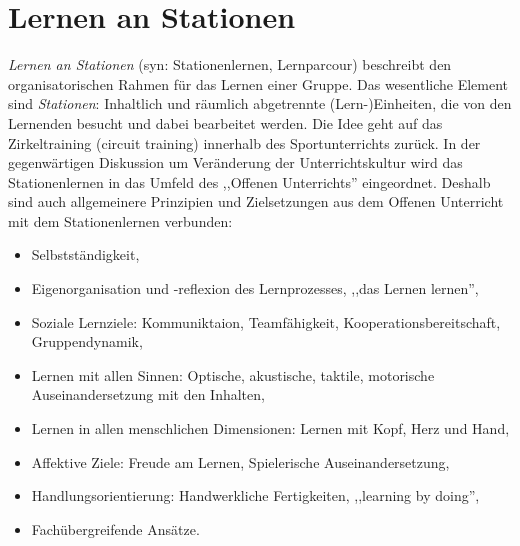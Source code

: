 \bip\bip
\section{Lernen an Stationen}

\emph{Lernen an Stationen} (syn: Stationenlernen, Lernparcour) beschreibt den organisatorischen Rahmen f\"{u}r
das Lernen einer Gruppe. Das wesentliche Element sind \emph{Stationen}: Inhaltlich und r\"{a}umlich abgetrennte
(Lern-)Einheiten, die von den Lernenden besucht und dabei bearbeitet werden.
\mip
Die Idee geht auf das Zirkeltraining (circuit training) innerhalb des Sportunterrichts zur\"{u}ck.
In der gegenw\"{a}rtigen Diskussion um Ver\"{a}nderung der Unterrichtskultur wird das Stationenlernen
in das Umfeld des ,,Offenen Unterrichts'' eingeordnet.
\mip
Deshalb sind auch allgemeinere Prinzipien und Zielsetzungen aus dem Offenen Unterricht
mit dem Stationenlernen verbunden:
\begin{itemize}
\item Selbstst\"{a}ndigkeit,
\item Eigenorganisation und -reflexion des Lernprozesses, ,,das Lernen lernen'',
\item Soziale Lernziele: Kommuniktaion, Teamf\"{a}higkeit, Kooperationsbereitschaft, Gruppendynamik,
\item Lernen mit allen Sinnen: Optische, akustische, taktile, motorische Auseinandersetzung mit den Inhalten,
\item Lernen in allen menschlichen Dimensionen: Lernen mit Kopf, Herz und Hand,
\item Affektive Ziele: Freude am Lernen, Spielerische Auseinandersetzung,
\item Handlungsorientierung: Handwerkliche Fertigkeiten, ,,learning by doing'',
\item Fach\"{u}bergreifende Ans\"{a}tze.
\end{itemize}

